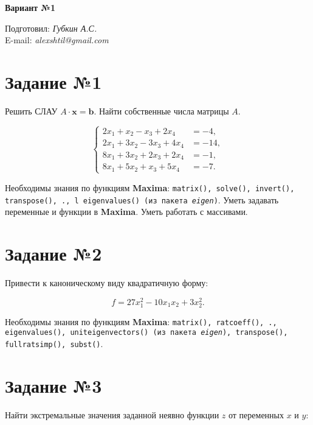 \begin{center}
    \textbf{\huge Вариант №1}
\end{center}

\begin{flushright}
    Подготовил: \textit{Губкин А.С.}\\
    E-mail: \textit{alexshtil@gmail.com}\\
\end{flushright}

\section*{Задание №1}

    Решить СЛАУ $A \cdot \mathbf{x} = \mathbf{b}$. Найти собственные числа матрицы $A$.

    \[
        \left\{
            \begin{aligned}
                2 x_{1} + x_{2} - x_{3} + 2 x_{4} &= -4,\\
                2 x_{1} + 3 x_{2} - 3 x_{3} + 4 x_{4} &= -14,\\
                8 x_{1} + 3 x_{2} + 2 x_{3} + 2 x_{4} &= -1,\\
                8 x_{1} + 5 x_{2} + x_{3} + 5 x_{4} &= -7.
            \end{aligned}
        \right.
    \]
    
    Необходимы знания по функциям \textbf{Maxima}: {\tt matrix(), solve(), invert(), transpose(), ., ^^, eigenvalues() (из пакета \textit{eigen})}. Уметь задавать переменные и функции в \textbf{Maxima}. Уметь работать с массивами.

\section*{Задание №2}

    Привести к каноническому виду квадратичную форму: 

    \[
        f = 27 x^{2}_{1} - 10 x_{1} x_{2} + 3 x^{2}_{2}.
    \]

    Необходимы знания по функциям \textbf{Maxima}: {\tt matrix(), ratcoeff(), ., eigenvalues(), uniteigenvectors() (из пакета \textit{eigen}), transpose(), fullratsimp(), subst()}.

\section*{Задание №3}

    Найти экстремальные значения заданной неявно функции $z$ от переменных $x$ и $y$: 

